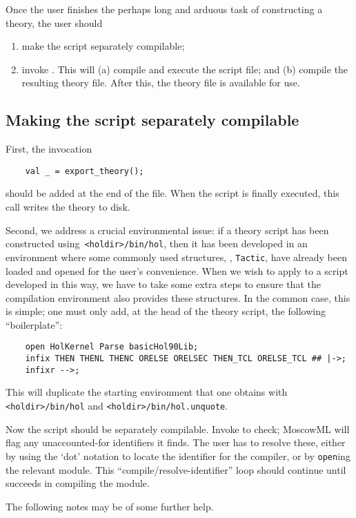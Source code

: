 Once the user finishes the perhaps long and arduous task of constructing
a theory, the user should
\begin{enumerate}
\item make the script separately compilable;
\item invoke \holmake{}. This will (a) compile and execute the
  script file; and (b) compile the resulting theory file. After this,
  the theory file is available for use.
\end{enumerate}

\subsection{Making the script separately compilable}

First, the invocation
\begin{verbatim}
    val _ = export_theory();
\end{verbatim}
should be added at the end of the file. When the script is finally
executed, this call writes the theory to disk.

Second, we address a crucial environmental issue: if a theory script
has been constructed using\verb+ <holdir>/bin/hol+, then it has been
developed in an environment where some commonly used structures, \eg,
\verb+Tactic+, have already been loaded and opened for the user's
convenience. When we wish to apply \holmake{} to a script developed
in this way, we have to take some extra steps to ensure that the
compilation environment also provides these structures.  In the common
case, this is simple; one must only add, at the head of the theory
script, the following ``boilerplate'':
\begin{verbatim}
    open HolKernel Parse basicHol90Lib;
    infix THEN THENL THENC ORELSE ORELSEC THEN_TCL ORELSE_TCL ## |->;
    infixr -->;
\end{verbatim}
This will duplicate the starting environment that one obtains with
\verb+<holdir>/bin/hol+ and \verb+<holdir>/bin/hol.unquote+.

Now the script should be separately compilable. Invoke \holmake{}
to check; MoscowML will flag any unaccounted-for identifiers it finds.
The user has to resolve these, either by using the `dot' notation to
locate the identifier for the compiler, or by \verb+open+ing the
relevant module. This ``compile/resolve-identifier'' loop should
continue until \holmake{} succeeds in compiling the module.

The following notes may be of some further help.

